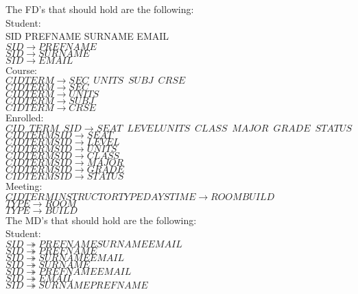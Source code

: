 The FD's that should hold are the following:  \\

Student: \\
SID \rightarrow PREFNAME \enspace SURNAME \enspace EMAIL \\
$SID \rightarrow PREFNAME$ \\
$SID \rightarrow SURNAME$ \\
$SID \rightarrow EMAIL$ \\ 

Course: \\
$CID TERM \rightarrow SEC \enspace UNITS \enspace SUBJ \enspace CRSE$ \\
$CID TERM \rightarrow SEC$ \\
$CID TERM \rightarrow UNITS$ \\ 
$CID TERM \rightarrow SUBJ$ \\
$CID TERM \rightarrow CRSE$ \\

Enrolled: \\
$CID \enspace TERM \enspace SID \rightarrow SEAT \enspace LEVEL UNITS \enspace CLASS \enspace MAJOR \enspace GRADE \enspace STATUS$\\
$CID TERM SID \rightarrow SEAT$\\
$CID TERM SID \rightarrow LEVEL$\\
$CID TERM SID \rightarrow UNITS$\\
$CID TERM SID \rightarrow CLASS$\\
$CID TERM SID \rightarrow MAJOR$\\
$CID TERM SID \rightarrow GRADE$\\
$CID TERM SID \rightarrow STATUS$\\

Meeting: \\
$CID TERM INSTRUCTOR TYPE DAYS TIME \rightarrow ROOM BUILD$ \\
$TYPE \rightarrow ROOM$ \\
$TYPE \rightarrow BUILD$ \\


The MD's that should hold are the following: \\

Student: \\
$SID \twoheadrightarrow PREFNAME SURNAME EMAIL$ \\
$SID \twoheadrightarrow PREFNAME$ \\
$SID \twoheadrightarrow SURNAME EMAIL$ \\
$SID \twoheadrightarrow SURNAME$ \\
$SID \twoheadrightarrow PREFNAME EMAIL$ \\
$SID \twoheadrightarrow EMAIL$ \\ 
$SID \twoheadrightarrow SURNAME PREFNAME$ \\


